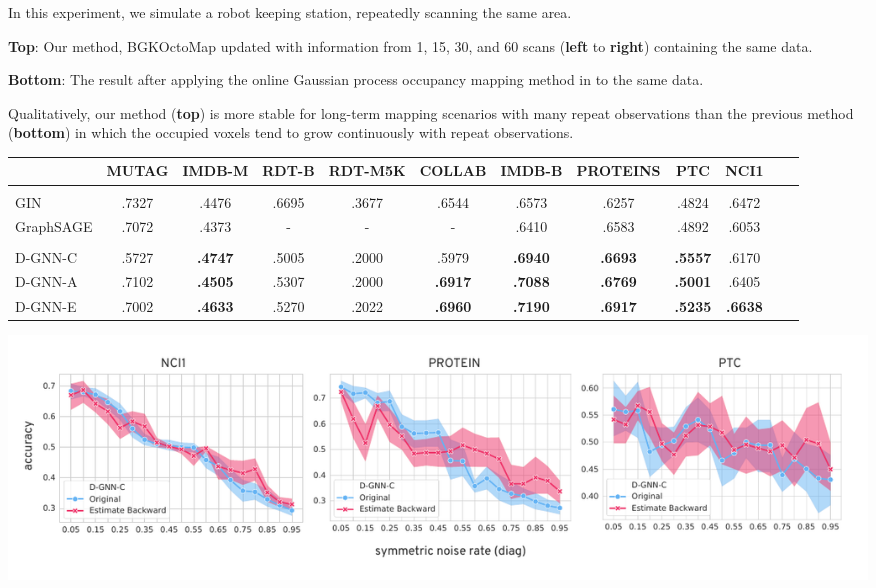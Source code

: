 \documentclass[portrait,final,archD,fontscale=0.477]{baposter}
\begin{document}
\begin{poster}
{\begin{multicols}{2}
\columnbreak

In this experiment, we simulate a robot keeping station, repeatedly scanning the same area. 

\textbf{Top}: Our method, BGKOctoMap updated with information from 1, 15, 30, and 60 scans (\textbf{left} to \textbf{right}) containing the same data.

\textbf{Bottom}: The result after applying the online Gaussian process occupancy mapping method in \cite{jwang} to the same data.

Qualitatively, our method (\textbf{top}) is more stable for long-term mapping scenarios with many repeat observations than the previous method (\textbf{bottom}) in which the occupied voxels tend to grow continuously with repeat observations.

\end{multicols}


\hspace{-1.5em}
  \begin{tabular}{lccccccccccc}
                                 & MUTAG   & IMDB-M    & RDT-B   & RDT-M5K & COLLAB    & IMDB-B   & PROTEINS    & PTC         & NCI1 \\
    \hline \\
    GIN                          & .7327   & .4476     & .6695   & .3677   & .6544     & .6573    & .6257       & .4824       & .6472 \\
    GraphSAGE                    & .7072   & .4373     &   -     & -       & -         & .6410    & .6583       & .4892       & .6053 
    \vspace{0.5em}\\
    \hline \vspace{-0.5em} \\
    D-GNN-C                      &  .5727  &  \bf.4747 & .5005   & .2000   &  .5979    & \bf.6940 & \bf.6693    & \bf.5557       &  .6170 \\
    D-GNN-A                      &  .7102  &  \bf.4505 & .5307   & .2000   &  \bf.6917 & \bf.7088 & \bf.6769    & \bf.5001       & .6405  \\
    D-GNN-E                      &  .7002  &  \bf.4633 & .5270   & .2022   &  \bf.6960 & \bf.7190 & \bf.6917    & \bf.5235       & \bf.6638 \\
  \end{tabular}

\includegraphics[width=0.95\linewidth]{img/notgood}

}
\end{poster}
\end{document}
